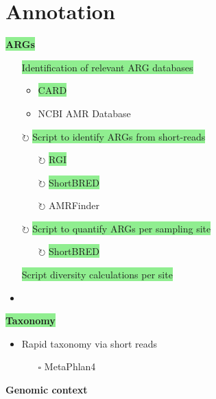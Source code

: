 \documentclass[11pt]{article}
\newcommand{\done}{\checkmark}  %
\newcommand{\pending}{$\square$}  %
\newcommand{\refine}{$\circlearrowright$}  %
\newcommand{\highlightessential}[1]{\colorbox{lightgreen}{#1}}  %
\newcommand{\highlightoptional}[1]{\colorbox{lightorange}{#1}}  %
\begin{document}
\section{Annotation}
\par\noindent\hspace{1cm}\highlightessential{\textbf{\large ARGs}}  %
	\begin{itemize}
		\item [\done] \highlightessential{Identification of relevant ARG databases}
			\begin{itemize}
				\item \highlightessential{CARD}
				\item \highlightoptional{NCBI AMR Database}
			\end{itemize}
		\item [\refine]\highlightessential{Script to identify ARGs from short-reads}
			\begin{itemize}
				\item [\refine] \highlightessential{RGI}
				\item [\refine] \highlightessential{ShortBRED}
				\item [\refine] \highlightoptional{AMRFinder}
			\end{itemize}
		\item [\refine] \highlightessential{Script to quantify ARGs per sampling site}
			\begin{itemize}
				\item [\refine] \highlightessential{ShortBRED}
			\end{itemize}
		\item [\done] \highlightessential{Script diversity calculations per site}
		\item 
	\end{itemize}
\par\noindent\hspace{1cm}\highlightessential{\textbf{\large Taxonomy}}  %
	\begin{itemize}
		\item Rapid taxonomy via short reads
			\begin{itemize}
				\item [\pending] \highlightoptional{MetaPhlan4}
				
			\end{itemize}
	\end{itemize}
\par\noindent\hspace{1cm}\highlightoptional{\textbf{\large Genomic context}}  %
\end{document}
